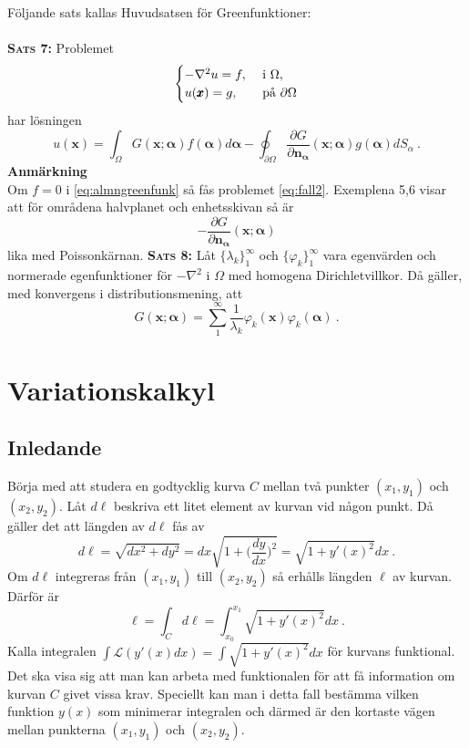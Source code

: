\documentclass{article}
\begin{document}
Följande sats kallas Huvudsatsen för Greenfunktioner:\\ \\
\textbf{\textsc{Sats 7:}} Problemet
\begin{equation}
    \begin{cases}
    -\nabla^2u=f, \ &$i$ \ \Omega,\\
    u(\pmb{x})=g, \ &$på$ \ \partial\Omega
    \end{cases}
\end{equation}
har lösningen 
\begin{equation}\label{eq:almngreenfunk}
    u(\pmb{x})=\int_{\Omega}G(\pmb{x};\pmb{\alpha})f(\pmb{\alpha})d\pmb\alpha-\oint_{\partial\Omega}\frac{\partial G}{\partial \pmb{n_{\alpha}}}(\pmb{x};\pmb{\alpha})g(\pmb{\alpha})dS_{\alpha} \ .
\end{equation}
\textbf{Anmärkning}\\
Om $f=0$ i \eqref{eq:almngreenfunk} så fås problemet \eqref{eq:fall2}. Exemplena 5,6 visar att för områdena halvplanet och enhetsskivan så är 
$$
-\frac{\partial G}{\partial \pmb{n_{\alpha}}}(\pmb{x};\pmb{\alpha})
$$
lika med Poissonkärnan.
\newpage
\noindent
\textsc{\textbf{Sats 8:}} Låt $\{\lambda_k\}_1^{\infty}$ och $\{\varphi_k\}_1^{\infty}$ vara egenvärden och normerade egenfunktioner för $-\nabla^2$ i $\Omega$ med homogena Dirichletvillkor. Då gäller, med konvergens i distributionsmening, att
$$
G(\pmb{x};\pmb{\alpha})=\sum_1^{\infty}\frac{1}{\lambda_k}\varphi_k(\pmb{x})\varphi_k(\pmb{\alpha}) \ .
$$


\section{Variationskalkyl}
\subsection{Inledande}
Börja med att studera en godtycklig kurva $C$ mellan två punkter $(x_1,y_1)$ och $(x_2,y_2)$. Låt $d\ell$ beskriva ett litet element av kurvan vid någon punkt. Då gäller det att längden av $d\ell$ fås av
$$
d\ell=\sqrt{dx^2+dy^2}=dx\sqrt{1+\Big(\frac{dy}{dx}\Big)^2}=\sqrt{1+y'(x)^2}dx \ .
$$
Om $d\ell$ integreras från $(x_1,y_1)$ till $(x_2,y_2)$  så erhålls längden $\ell$ av kurvan. Därför är 
$$
\ell=\int_C d\ell=\int_{x_0}^{x_1}\sqrt{1+y'(x)^2}dx \ .
$$
Kalla integralen $\int\mathcal{L}(y'(x)dx)=\int\sqrt{1+y'(x)^2}dx$ för kurvans funktional. Det ska visa sig att man kan arbeta med funktionalen för att få information om kurvan $C$ givet vissa krav. Speciellt kan man i detta fall bestämma vilken funktion $y(x)$ som minimerar integralen och därmed är den kortaste vägen mellan punkterna $(x_1,y_1)$ och $(x_2,y_2)$.
\end{document}

